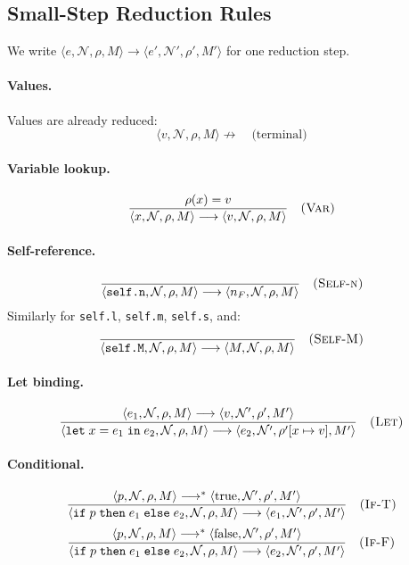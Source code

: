 \documentclass[twocolumn,11pt,a4paper]{article}
\theoremstyle{definition}
\theoremstyle{remark}
\newcommand{\Node}{\mathcal{N}}
\newcommand{\reduces}{\longrightarrow}
\newcommand{\reducesN}{\longrightarrow^{*}}
\begin{document}
\subsection{Small-Step Reduction Rules}

We write $\langle e, \Node, \rho, M \rangle \reduces
\langle e', \Node', \rho', M' \rangle$ for one reduction step.

\paragraph{Values.}  Values are already reduced:
\[
\langle v, \Node, \rho, M \rangle \not\reduces \quad \text{(terminal)}
\]

\paragraph{Variable lookup.}
\[
\frac{\rho(x) = v}
     {\langle x, \Node, \rho, M \rangle \reduces
      \langle v, \Node, \rho, M \rangle}
\quad\textsc{(Var)}
\]

\paragraph{Self-reference.}
\[
\frac{}
     {\langle \texttt{self.n}, \Node, \rho, M \rangle \reduces
      \langle n_F, \Node, \rho, M \rangle}
\quad\textsc{(Self-n)}
\]
Similarly for \texttt{self.l}, \texttt{self.m}, \texttt{self.s},
and:
\[
\frac{}
     {\langle \texttt{self.M}, \Node, \rho, M \rangle \reduces
      \langle M, \Node, \rho, M \rangle}
\quad\textsc{(Self-M)}
\]

\paragraph{Let binding.}
\[
\frac{\langle e_1, \Node, \rho, M \rangle \reduces
      \langle v, \Node', \rho', M' \rangle}
     {\langle \texttt{let}\; x = e_1\; \texttt{in}\; e_2,
      \Node, \rho, M \rangle \reduces
      \langle e_2, \Node', \rho'[x \mapsto v], M' \rangle}
\quad\textsc{(Let)}
\]

\paragraph{Conditional.}
\[
\frac{\langle p, \Node, \rho, M \rangle \reducesN
      \langle \mathrm{true}, \Node', \rho', M' \rangle}
     {\langle \texttt{if}\; p\; \texttt{then}\; e_1\; \texttt{else}\; e_2,
      \Node, \rho, M \rangle \reduces
      \langle e_1, \Node', \rho', M' \rangle}
\quad\textsc{(If-T)}
\]
\[
\frac{\langle p, \Node, \rho, M \rangle \reducesN
      \langle \mathrm{false}, \Node', \rho', M' \rangle}
     {\langle \texttt{if}\; p\; \texttt{then}\; e_1\; \texttt{else}\; e_2,
      \Node, \rho, M \rangle \reduces
      \langle e_2, \Node', \rho', M' \rangle}
\quad\textsc{(If-F)}
\]
\end{document}
